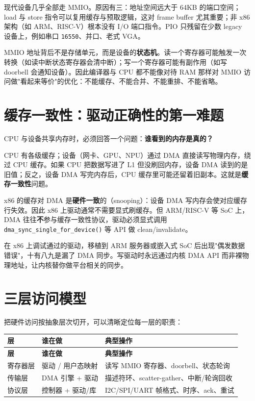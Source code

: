 \documentclass[12pt,a4paper,fontset=fandol]{ctexbook}
\newcommand{\Fn}[1]{\texttt{#1()}}
\begin{document}
现代设备几乎全部走 MMIO。原因有三：地址空间远大于 64KB 的端口空间；load 与 store 指令可以复用缓存与预取逻辑，这对 frame buffer 尤其重要；非 x86 架构（如 ARM、RISC-V）根本没有 I/O 端口指令。PIO 只残留在少数 legacy 设备上，例如串口 \texttt{16550}、并口、老式 VGA。

\begin{tcolorbox}[guideline={MMIO 与 RAM 的本质区别}]
MMIO 地址背后不是存储单元，而是设备的\textbf{状态机}。读一个寄存器可能触发一次转换（如读中断状态寄存器会清中断）；写一个寄存器可能有副作用（如写 doorbell 会通知设备）。因此编译器与 CPU 都不能像对待 RAM 那样对 MMIO 访问做"看起来等价"的优化：不能缓存、不能合并、不能重排、不能省略。
\end{tcolorbox}

\section{缓存一致性：驱动正确性的第一难题}\label{sec:coherence}

CPU 与设备共享内存时，必须回答一个问题：\textbf{谁看到的内存是真的？}

CPU 有各级缓存；设备（网卡、GPU、NPU）通过 DMA 直接读写物理内存，绕过 CPU 缓存。如果 CPU 把数据写进了 L1 但没刷回内存，设备 DMA 读到的是旧值；反之，设备 DMA 写完内存后，CPU 缓存里可能还留着旧副本。这就是\textbf{缓存一致性}问题。

x86 的缓存对 DMA 是\textbf{硬件一致}的（snooping）：设备 DMA 写内存会使对应缓存行失效。因此 x86 上驱动通常不需要显式刷缓存。但 ARM/RISC-V 等 SoC 上，DMA 往往\textbf{不}参与缓存一致性协议，驱动必须显式调用 \Fn{dma\_sync\_single\_for\_device} 等 API 做 clean/invalidate。

\begin{tcolorbox}[warning={不要假设 x86 的便利是通用的}]
在 x86 上调试通过的驱动，移植到 ARM 服务器或嵌入式 SoC 后出现"偶发数据错误"，十有八九是漏了 DMA 同步。写驱动时永远通过内核 DMA API 而非裸物理地址，让内核替你做平台相关的同步。
\end{tcolorbox}

\section{三层访问模型}\label{sec:three-layers}

把硬件访问按抽象层次切开，可以清晰定位每一层的职责：

\begin{longtable}{p{2.6cm}p{5.2cm}p{6.9cm}}
\toprule
\textbf{层} & \textbf{谁在做} & \textbf{典型操作} \\
\midrule
\endfirsthead
\toprule
\textbf{层} & \textbf{谁在做} & \textbf{典型操作} \\
\midrule
\endhead
寄存器层 & 驱动 / 用户态映射 & 读写 MMIO 寄存器、doorbell、状态轮询 \\
传输层   & DMA 引擎 + 驱动     & 描述符环、scatter-gather、中断/轮询回收 \\
协议层   & 控制器 + 驱动/库     & I2C/SPI/UART 帧格式、时序、ack、重试 \\
\bottomrule
\end{longtable}
\end{document}
